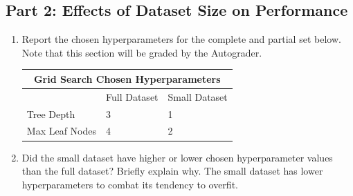 \subsection{Part 2: Effects of Dataset Size on Performance}
\begin{enumerate}
    \item Report the chosen hyperparameters for the complete and partial set below. Note that this section will be graded by the Autograder.
    \begin{center}
        \begin{tabular}{ |p{6cm}||p{3cm}|p{3cm}|  }
         \hline
         \multicolumn{3}{|c|}{Grid Search Chosen Hyperparameters} \\
         \hline
         & Full Dataset & Small Dataset\\
         \hline
         Tree Depth   & 3    &1\\
         Max Leaf Nodes   & 4    &2\\
         \hline
        \end{tabular}
    \end{center}
    \item Did the small dataset have higher or lower chosen hyperparameter values than the full dataset? Briefly explain why.
    \newline
    \newline
    The small dataset has lower hyperparameters to combat its tendency to overfit.
    
\end{enumerate}

